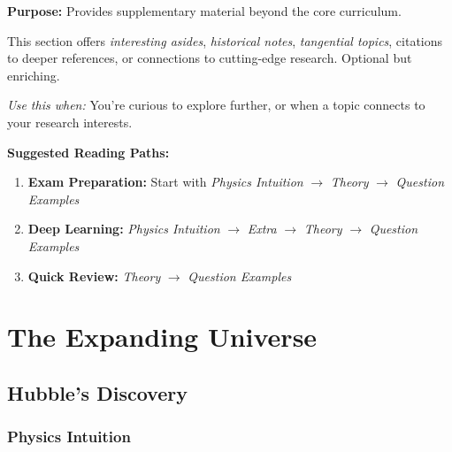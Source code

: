 \documentclass[12pt, a4paper, openright]{report}
\begin{document}
\bigskip

\noindent
\begin{minipage}{0.9\textwidth}
  \begin{tcolorbox}[breakable, colback=GrayBG, colframe=SlateGray, 
                     leftrule=2pt, rightrule=2pt, arc=3pt,
                     before upper={\textcolor{SlateGray}{\textbf{\scshape Extra}}\par\smallskip}]
    \textbf{Purpose:} Provides supplementary material beyond the core curriculum.
    
    This section offers \emph{interesting asides}, \emph{historical notes}, 
    \emph{tangential topics}, citations to deeper references, or connections 
    to cutting-edge research. Optional but enriching.
    
    \smallskip
    \textit{Use this when:} You're curious to explore further, or when a topic 
    connects to your research interests.
  \end{tcolorbox}
\end{minipage}

\bigskip\bigskip

\noindent
\textbf{Suggested Reading Paths:}
\begin{enumerate}
  \item \textbf{Exam Preparation:} Start with \textit{Physics Intuition} $\to$ 
        \textit{Theory} $\to$ \textit{Question Examples}
  \item \textbf{Deep Learning:} \textit{Physics Intuition} $\to$ \textit{Extra} 
        $\to$ \textit{Theory} $\to$ \textit{Question Examples}
  \item \textbf{Quick Review:} \textit{Theory} $\to$ \textit{Question Examples}
\end{enumerate}

\clearpage


\chapter{The Expanding Universe}

\section{Hubble's Discovery}

\subsection{Physics Intuition}
\end{document}

